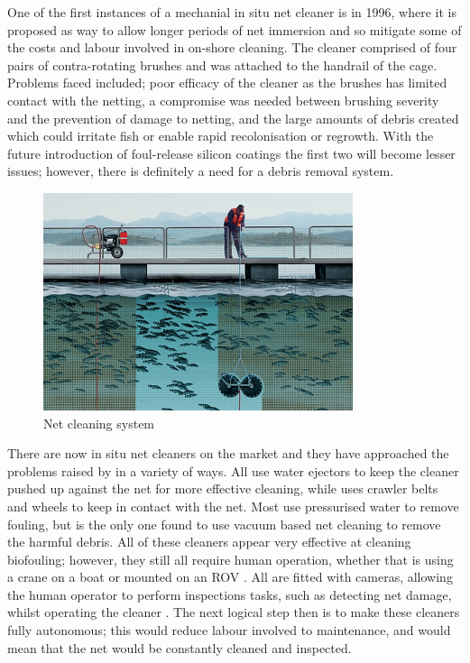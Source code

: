 \documentclass[11.5pt, twoside, a4paper]{article}
\begin{document}
One of the first instances of a mechanial in situ net cleaner is \cite{hodson2000biofouling} in 1996, where it is proposed as way to allow longer periods of net immersion and so mitigate some of the costs and labour involved in on-shore cleaning. The cleaner comprised of four pairs of contra-rotating brushes and was attached to the handrail of the cage. Problems faced included; poor efficacy of the cleaner as the brushes has limited contact with the netting, a compromise was needed between brushing severity and the prevention of damage to netting, and the large amounts of debris created which could irritate fish or enable rapid recolonisation or regrowth. With the future introduction of foul-release silicon coatings the first two will become lesser issues; however, there is definitely a need for a debris removal system. 

\begin{figure}
\begin{center}
\includegraphics{cleaner.png}
\caption{Net cleaning system \cite{AKVA} \label{fig:cleaner}}
\end{center}
\end{figure}


There are now in situ net cleaners on the market \cite{Yanmar,AKVA,MPI,Hughesbrochure,MIC} and they have approached the problems raised by \cite{hodson1997biofouling} in a variety of ways. All \cite{AKVA,Hughesbrochure,MPI} use water ejectors to keep the cleaner pushed up against the net for more effective cleaning, while \cite{Yanmar} uses crawler belts and wheels to keep in contact with the net. Most use pressurised water to remove fouling, but \cite{MIC} is the only one found to use vacuum based net cleaning to remove the harmful debris. All of these cleaners appear very effective at cleaning biofouling; however, they still all require human operation, whether that is using a crane on a boat \cite{AKVA} or mounted on an ROV \cite{Hughesbrochure}. All are fitted with cameras, allowing the human operator to perform inspections tasks, such as detecting net damage, whilst operating the cleaner \cite{Yanmar}. The next logical step then is to make these cleaners fully autonomous; this would reduce labour involved to maintenance, and would mean that the net would be constantly cleaned and inspected.
\end{document}
